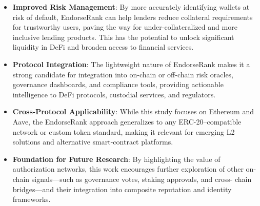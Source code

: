 \begin{itemize}
\item[\textbullet] \textbf{Improved Risk Management}: By more accurately identifying wallets at risk of default, EndorseRank can help lenders reduce collateral requirements for trustworthy users, paving the way for under-collateralized and more inclusive lending products. This has the potential to unlock significant liquidity in DeFi and broaden access to financial services.
\item[\textbullet] \textbf{Protocol Integration}: The lightweight nature of EndorseRank makes it a strong candidate for integration into on-chain or off-chain risk oracles, governance dashboards, and compliance tools, providing actionable intelligence to DeFi protocols, custodial services, and regulators.
\end{itemize}

\begin{itemize}
\item[\textbullet] \textbf{Cross-Protocol Applicability}: While this study focuses on Ethereum and Aave, the EndorseRank approach generalizes to any ERC-20--compatible network or custom token standard, making it relevant for emerging L2 solutions and alternative smart-contract platforms.
\item[\textbullet] \textbf{Foundation for Future Research}: By highlighting the value of authorization networks, this work encourages further exploration of other on-chain signals---such as governance votes, staking approvals, and cross- chain bridges---and their integration into composite reputation and identity frameworks.
\end{itemize}
